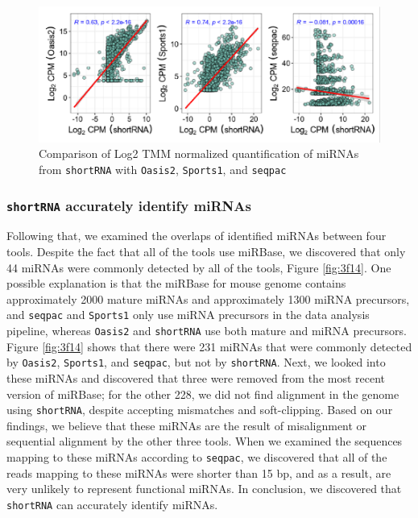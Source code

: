 \documentclass[12pt,twoside]{reedthesis}
\begin{document}
\begin{figure}[htbp]

{\centering \includegraphics{thesis_files/figure-latex/3f13-1} 

}

\caption{Comparison of Log2 TMM normalized quantification of miRNAs
from \texttt{shortRNA} with \texttt{Oasis2}, \texttt{Sports1}, and \texttt{seqpac}}\label{fig:3f13}
\end{figure}
\hypertarget{shortrna-accurately-identify-mirnas}{%
\subsubsection{\texorpdfstring{\texttt{shortRNA} accurately identify miRNAs}{shortRNA accurately identify miRNAs}}\label{shortrna-accurately-identify-mirnas}}

Following that, we examined the overlaps of identified miRNAs between
four tools. Despite the fact that all of the tools use miRBase, we
discovered that only 44 miRNAs were commonly detected by all of the
tools, Figure \ref{fig:3f14}. One possible explanation is that the
miRBase for mouse genome contains approximately 2000 mature miRNAs and
approximately 1300 miRNA precursors, and \texttt{seqpac} and \texttt{Sports1} only use
miRNA precursors in the data analysis pipeline, whereas \texttt{Oasis2} and
\texttt{shortRNA} use both mature and miRNA precursors. Figure \ref{fig:3f14}
shows that there were 231 miRNAs that were commonly detected by
\texttt{Oasis2}, \texttt{Sports1}, and \texttt{seqpac}, but not by \texttt{shortRNA}. Next, we
looked into these miRNAs and discovered that three were removed from the
most recent version of miRBase; for the other 228, we did not find
alignment in the genome using \texttt{shortRNA}, despite accepting mismatches
and soft-clipping. Based on our findings, we believe that these miRNAs
are the result of misalignment or sequential alignment by the other
three tools. When we examined the sequences mapping to these miRNAs
according to \texttt{seqpac}, we discovered that all of the reads mapping to
these miRNAs were shorter than 15 bp, and as a result, are very unlikely
to represent functional miRNAs. In conclusion, we discovered that
\texttt{shortRNA} can accurately identify miRNAs.
\end{document}
